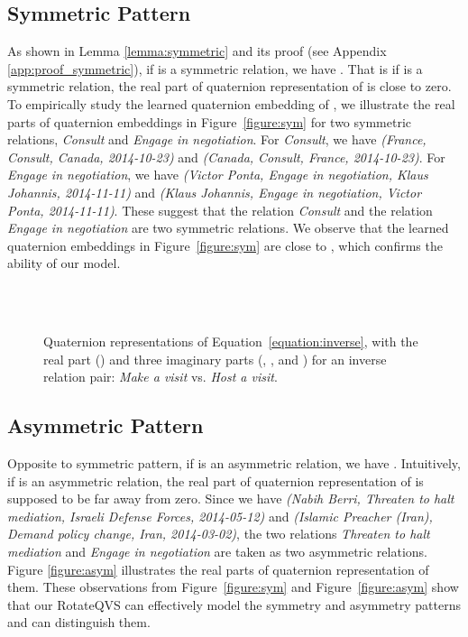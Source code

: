 \documentclass[11pt]{article}
\newcommand{\exam}[1]{\emph{#1}\xspace}
\begin{document}
\subsection{Symmetric Pattern}
As shown in Lemma \ref{lemma:symmetric} and its proof (see Appendix \ref{app:proof_symmetric}), if  is a symmetric relation, we have
.
That is if  is a symmetric relation, the real part of quaternion representation of  is close to zero.
To empirically study the learned quaternion embedding of , we illustrate the real parts of quaternion embeddings in Figure~\ref{figure:sym} for two symmetric relations, \textit{Consult} and \textit{Engage in negotiation}. For \exam{Consult}, we have \textit{(France, Consult, Canada, 2014-10-23)} and \textit{(Canada, Consult,  France, 2014-10-23)}.
For \exam{Engage in negotiation}, we have \textit{(Victor Ponta, Engage in negotiation, Klaus Johannis, 2014-11-11)} and \textit{(Klaus Johannis, Engage in negotiation, Victor Ponta, 2014-11-11)}.
These suggest that the relation \textit{Consult} and the relation \textit{Engage in negotiation} are two symmetric relations.
We observe that the learned quaternion embeddings in Figure~\ref{figure:sym} are close to , which confirms the ability of our model.


\begin{figure}[!t]
  \centering
	 \\
	 \\
  \caption{Quaternion representations of Equation~\ref{equation:inverse}, with the real part () and three imaginary parts (, , and ) for an inverse relation pair: \exam{Make a visit} vs. \exam{Host a visit}.}
	\label{figure:inverse}
\end{figure}

\subsection{Asymmetric Pattern}
Opposite to symmetric pattern, if  is an asymmetric relation, we have
.
Intuitively, if  is an asymmetric relation, the real part of quaternion representation of  is supposed to be far away from zero.
Since we have \textit{(Nabih Berri, Threaten to halt mediation, Israeli Defense Forces, 2014-05-12)} and \textit{(Islamic Preacher (Iran), Demand policy change, Iran, 2014-03-02)}, the two relations \textit{Threaten to halt mediation} and \textit{Engage in negotiation} are taken as two asymmetric relations.
Figure \ref{figure:asym} illustrates the real parts of quaternion representation of them.
These observations from Figure~\ref{figure:sym} and Figure~\ref{figure:asym} show that our RotateQVS can effectively model the symmetry and asymmetry patterns and can distinguish them.
\end{document}
